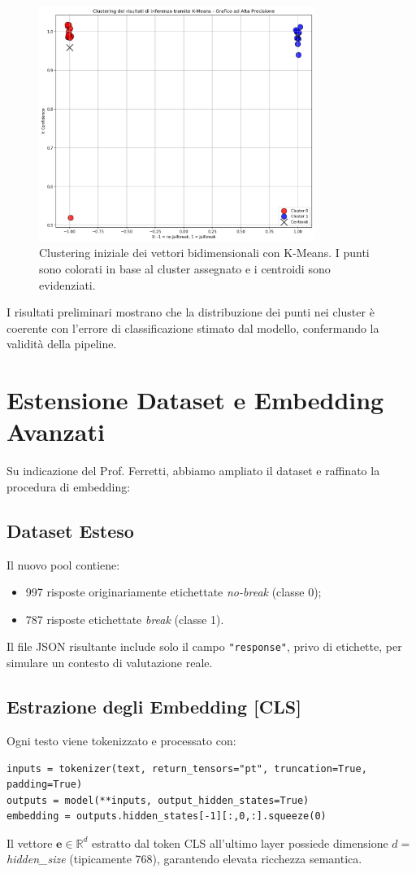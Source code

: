 \documentclass[a4paper,11pt]{article}
\begin{document}
\begin{figure}[H]
\includegraphics[width=0.8\textwidth]{1.png} \caption{Clustering iniziale dei vettori bidimensionali con K-Means. I punti sono colorati in base al cluster assegnato e i centroidi sono evidenziati.}
  \label{fig:clustering2d}
\end{figure}

I risultati preliminari mostrano che la distribuzione dei punti nei cluster è coerente con l'errore di classificazione stimato dal modello, confermando la validità della pipeline.

\section{Estensione Dataset e Embedding Avanzati}
Su indicazione del Prof. Ferretti, abbiamo ampliato il dataset e raffinato la procedura di embedding:

\subsection{Dataset Esteso}
Il nuovo pool contiene:
\begin{itemize}
  \item 997 risposte originariamente etichettate \emph{no-break} (classe 0);
  \item 787 risposte etichettate \emph{break} (classe 1).
\end{itemize}
Il file JSON risultante include solo il campo \texttt{"response"}, privo di etichette, per simulare un contesto di valutazione reale.

\subsection{Estrazione degli Embedding [CLS]}
Ogni testo viene tokenizzato e processato con:\\
\begin{lstlisting}
inputs = tokenizer(text, return_tensors="pt", truncation=True, padding=True)
outputs = model(**inputs, output_hidden_states=True)
embedding = outputs.hidden_states[-1][:,0,:].squeeze(0)
\end{lstlisting}
Il vettore \(\mathbf{e}\in\mathbb{R}^{d}\) estratto dal token CLS all'ultimo layer possiede dimensione \(d=\) \textit{hidden\_size} (tipicamente 768), garantendo elevata ricchezza semantica.
\end{document}
